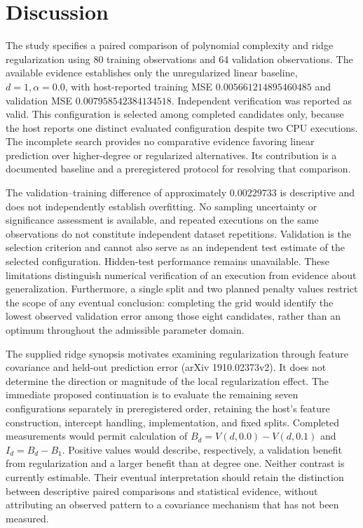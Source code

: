 \documentclass[11pt]{article}
\begin{document}
\section{Discussion}
The study specifies a paired comparison of polynomial complexity and ridge regularization using 80 training observations and 64 validation observations. The available evidence establishes only the unregularized linear baseline, \(d=1,\alpha=0.0\), with host-reported training MSE \(0.005661214895460485\) and validation MSE \(0.007958542384134518\). Independent verification was reported as valid. This configuration is selected among completed candidates only, because the host reports one distinct evaluated configuration despite two CPU executions. The incomplete search provides no comparative evidence favoring linear prediction over higher-degree or regularized alternatives. Its contribution is a documented baseline and a preregistered protocol for resolving that comparison.

The validation--training difference of approximately \(0.00229733\) is descriptive and does not independently establish overfitting. No sampling uncertainty or significance assessment is available, and repeated executions on the same observations do not constitute independent dataset repetitions. Validation is the selection criterion and cannot also serve as an independent test estimate of the selected configuration. Hidden-test performance remains unavailable. These limitations distinguish numerical verification of an execution from evidence about generalization. Furthermore, a single split and two planned penalty values restrict the scope of any eventual conclusion: completing the grid would identify the lowest observed validation error among those eight candidates, rather than an optimum throughout the admissible parameter domain.

The supplied ridge synopsis motivates examining regularization through feature covariance and held-out prediction error (arXiv 1910.02373v2). It does not determine the direction or magnitude of the local regularization effect. The immediate proposed continuation is to evaluate the remaining seven configurations separately in preregistered order, retaining the host's feature construction, intercept handling, implementation, and fixed splits. Completed measurements would permit calculation of \(B_d=V(d,0.0)-V(d,0.1)\) and \(I_d=B_d-B_1\). Positive values would describe, respectively, a validation benefit from regularization and a larger benefit than at degree one. Neither contrast is currently estimable. Their eventual interpretation should retain the distinction between descriptive paired comparisons and statistical evidence, without attributing an observed pattern to a covariance mechanism that has not been measured.
\end{document}
